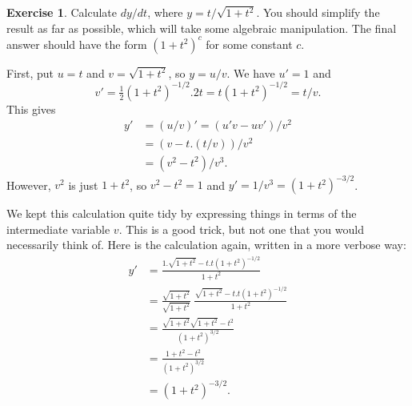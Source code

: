 \documentclass[a4paper]{book}
\theoremstyle{definition}
\newtheorem{exercise}[theorem]{Exercise}
\renewenvironment{solution}{\SolutionInline}{\endSolutionInline}
\begin{document}
\begin{exercise}
 Calculate $dy/dt$, where $y=t/\sqrt{1+t^2}$.  You should simplify
 the result as far as possible, which will take some algebraic
 manipulation.  The final answer should have the form $(1+t^2)^c$ for
 some constant $c$.
\end{exercise}
\begin{solution}
 First, put $u=t$ and $v=\sqrt{1+t^2}$, so $y=u/v$.  We have $u'=1$
 and 
 \[ v' = \tfrac{1}{2}(1+t^2)^{-1/2}.2t = t(1+t^2)^{-1/2} = t/v. \]
 This gives
 \begin{align*}
  y' &= (u/v)' = (u'v-uv')/v^2 \\
     &= (v-t.(t/v))/v^2 \\
     &= (v^2-t^2)/v^3.
 \end{align*}
 However, $v^2$ is just $1+t^2$, so $v^2-t^2=1$ and
 $y'=1/v^3=(1+t^2)^{-3/2}$. 

 We kept this calculation quite tidy by expressing things in terms of
 the intermediate variable $v$.  This is a good trick, but not one
 that you would necessarily think of.  Here is the calculation again,
 written in a more verbose way:
 \begin{align*}
  y' &= \frac{1.\sqrt{1+t^2}-t.t(1+t^2)^{-1/2}}{1+t^2} \\
     &= \frac{\sqrt{1+t^2}}{\sqrt{1+t^2}}\;
        \frac{\sqrt{1+t^2}-t.t(1+t^2)^{-1/2}}{1+t^2} \\
     &= \frac{\sqrt{1+t^2}\sqrt{1+t^2}-t^2}{(1+t^2)^{3/2}} \\
     &= \frac{1+t^2-t^2}{(1+t^2)^{3/2}} \\
     &= (1+t^2)^{-3/2}.
 \end{align*}
\end{solution}
\end{document}
